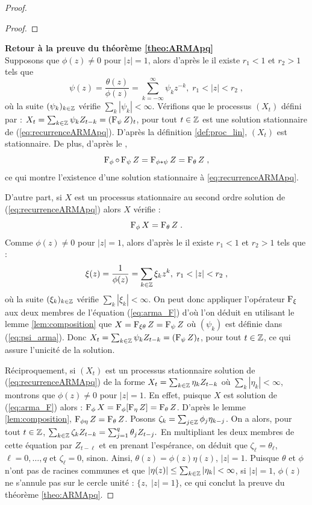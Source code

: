 \begin{proof}
\begin{proof}
\end{proof}

\textbf{Retour \`a la preuve du th\'eor\`eme \ref{theo:ARMApq}}\\

Supposons que $\phi(z)\neq 0$ pour $|z|= 1$, alors d'apr\`es
le  il existe $r_1<1$ et $r_2>1$ tels que
\begin{equation}\label{eq:psi_arma}
\psi(z)=\frac{\theta(z)}{\phi(z)}=\sum_{k=-\infty}^{\infty} \psi_k z^{-k},\; r_1<|z|<r_2\;,
\end{equation}
o\`u la suite $(\psi_k)_{k\in\mathbb{Z}}$ v\'erifie $\sum_k |\psi_k|<\infty$.
V\'erifions que le processus $(X_t)$ d\'efini par : $X_t=\sum_{k\in\mathbb{Z}} \psi_k Z_{t-k}=(\operatorname{F}_{\psi} Z)_t$, pour tout
$t\in\mathbb{Z}$ est une solution stationnaire de (\ref{eq:recurrenceARMApq}). D'apr\`es la d\'efinition
\ref{def:proc_lin}, $(X_t)$ est stationnaire. De plus, d'apr\`es le ,
$$
\operatorname{F}_{\phi} \circ \operatorname{F}_{\psi} Z =\operatorname{F}_{\phi*\psi}Z=\operatorname{F}_{\theta}Z \;,
$$
ce qui montre l'existence d'une solution
stationnaire \`a \eqref{eq:recurrenceARMApq}.

D'autre part, si $X$ est un processus stationnaire au second ordre solution de
(\ref{eq:recurrenceARMApq}) alors $X$ v\'erifie :
\begin{equation}\label{eq:arma_F}
\operatorname{F}_{\phi} X=\operatorname{F}_{\theta}Z\;.
\end{equation}
Comme $\phi(z)\neq 0$ pour $|z|= 1$, alors d'apr\`es le
 il existe $r_1<1$ et $r_2>1$ tels que :
$$
\xi(z)=\frac{1}{\phi(z)}=\sum_{k\in\Zset} \xi_k z^{k},\; r_1<|z|<r_2\;,
$$
o\`u la suite $(\xi_k)_{k\in\mathbb{Z}}$ v\'erifie $\sum_k |\xi_k|<\infty$.
On peut donc appliquer l'op\'erateur $\operatorname{F}_{\xi}$ aux deux membres de l'\'equation
(\ref{eq:arma_F}) d'o\`u l'on d\'eduit en utilisant le lemme \ref{lem:composition}
que $X=\operatorname{F}_{\xi\theta}Z=\operatorname{F}_{\psi} Z$ o\`u $(\psi_k)$ est d\'efinie dans (\ref{eq:psi_arma}).
Donc $X_t=\sum_{k\in\mathbb{Z}} \psi_k Z_{t-k}=(\operatorname{F}_{\psi} Z)_t$, pour tout
$t\in\mathbb{Z}$, ce qui assure l'unicit\'e de la solution.

R\'eciproquement, si $(X_t)$ est un processus stationnaire solution de (\ref{eq:recurrenceARMApq}) de la forme
$X_t=\sum_{k\in\mathbb{Z}}\eta_k Z_{t-k}$ o\`u $\sum_k |\eta_k|<\infty$, montrons que
$\phi(z)\neq 0$ pour $|z|= 1$. En effet, puisque $X$ est solution de (\ref{eq:arma_F})
alors : $\operatorname{F}_{\phi} X=\operatorname{F}_{\phi}[\operatorname{F}_{\eta} Z]=\operatorname{F}_{\theta} Z$. D'apr\`es le lemme \ref{lem:composition},
$\operatorname{F}_{\phi\eta}Z=\operatorname{F}_{\theta} Z$. Posons
$\zeta_k=\sum_{j\in\mathbb{Z}}\phi_j \eta_{k-j}$. On a alors, pour tout $t\in\mathbb{Z}$,
$\sum_{k\in\mathbb{Z}}\zeta_k Z_{t-k}=\sum_{j=1}^q\theta_j Z_{t-j}.$
En multipliant les deux membres de cette \'equation par $Z_{t-\ell}$
et en prenant l'esp\'erance, on d\'eduit que $\zeta_\ell=\theta_\ell$,
$\ell=0,\dots,q$ et $\zeta_\ell=0$, sinon. Ainsi,
$\theta(z)=\phi(z)\eta(z)$, $|z|=1$. Puisque $\theta$ et $\phi$
n'ont pas de racines communes et que $|\eta(z)|\leq\sum_{k\in\mathbb{Z}}|\eta_k|<\infty$,
si $|z|=1$, $\phi(z)$ ne s'annule pas sur le cercle unit\'e :
$\{z,\; |z|=1\}$, ce qui conclut la preuve du th\'eor\`eme \ref{theo:ARMApq}.


\end{proof}

